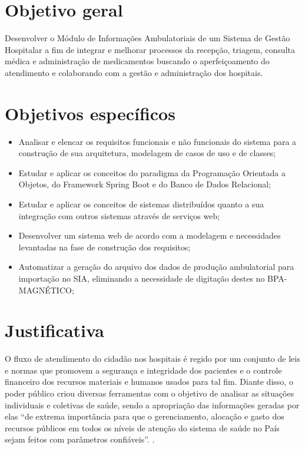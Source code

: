 \section{Objetivo geral}
 Desenvolver o Módulo de Informações Ambulatoriais de um Sistema de Gestão Hospitalar a fim de integrar e melhorar processos da recepção, triagem, consulta médica e administração de medicamentos buscando o aperfeiçoamento do atendimento e colaborando com a gestão e administração dos hospitais.
 
\section{Objetivos específicos}
\begin{itemize}
     \item Analisar e elencar os requisitos funcionais e não funcionais do sistema para a construção de sua arquitetura, modelagem de casos de uso e de classes;
    \item Estudar e aplicar os conceitos do paradigma da Programação Orientada a Objetos, do Framework Spring Boot e do Banco de Dados Relacional;
	\item Estudar e aplicar os conceitos de sistemas distribuídos quanto a sua integração com outros sistemas através de serviços web;
	\item Desenvolver um sistema web de acordo com a modelagem e necessidades levantadas na fase de construção dos requisitos;
	\item Automatizar a geração do arquivo dos dados de produção ambulatorial para importação no SIA, eliminando a necessidade de digitação destes no BPA-MAGNÉTICO; 
	 

\end{itemize}

\section{Justificativa}
O fluxo de atendimento do cidadão nos hospitais é regido por um conjunto de leis e normas que promovem a segurança e integridade dos pacientes e o controle financeiro dos recursos materiais e humanos usados para tal fim. Diante disso, o poder público criou diversas ferramentas com o objetivo de analisar as situações individuais e coletivas de saúde, sendo a apropriação das informações geradas por elas ``de extrema importância para que o gerenciamento, alocação e gasto dos recursos públicos em todos os níveis de atenção do sistema de saúde no País sejam feitos com parâmetros confiáveis''. \cite[p. 757]{neves}.


